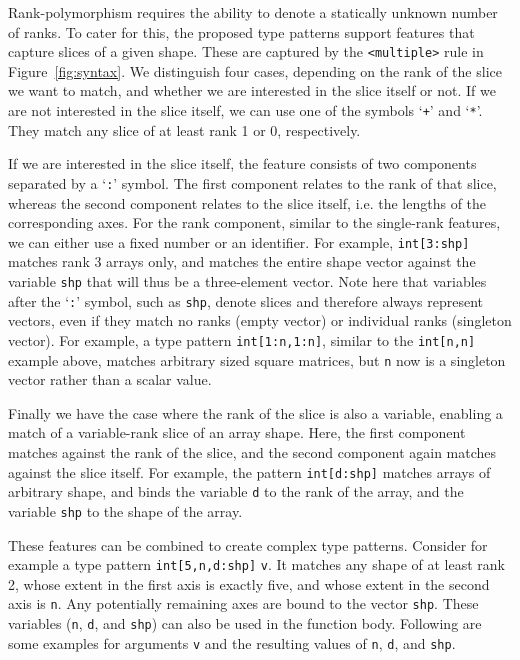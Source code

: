 Rank-polymorphism requires the ability to denote a statically unknown number of ranks.
To cater for this, the proposed type patterns support features that capture slices of a given shape.
These are captured by the \verb|<multiple>| rule in Figure~\ref{fig:syntax}.
We distinguish four cases, depending on the rank of the slice we want to match, and whether we are interested in the slice itself or not.
If we are not interested in the slice itself, we can use one of the symbols `\texttt{+}' and `\texttt{*}'.
They match any slice of at least rank 1 or 0, respectively.

If we are interested in the slice itself, the feature consists of two components separated by a `\texttt{:}' symbol.
The first component relates to the rank of that slice, whereas the second component relates to the slice itself, i.e. the lengths of the corresponding axes.
For the rank component, similar to the single-rank features, we can either use a fixed number or an identifier.
For example, \texttt{int[3:shp]} matches rank 3 arrays only, and matches the entire shape vector against the variable \texttt{shp} that will thus be a three-element vector.
Note here that variables after the `\texttt{:}' symbol, such as \texttt{shp}, denote slices and therefore always represent vectors, even if they match no ranks (empty vector) or individual ranks (singleton vector).
For example, a type pattern \texttt{int[1:n,1:n]}, similar to the \texttt{int[n,n]} example above, matches arbitrary sized square matrices, but \texttt{n} now is a singleton vector rather than a scalar value.

Finally we have the case where the rank of the slice is also a variable, enabling a match of a variable-rank slice of an array shape.
Here, the first component matches against the rank of the slice, and the second component again matches against the slice itself.
For example, the pattern \texttt{int[d:shp]} matches arrays of arbitrary shape, and binds the variable \texttt{d} to the rank of the array, and the variable \texttt{shp} to the shape of the array.

These features can be combined to create complex type patterns.
Consider for example a type pattern \texttt{int[5,n,d:shp]} \texttt{v}.
It matches any shape of at least rank 2, whose extent in the first axis is exactly five, and whose extent in the second axis is \texttt{n}.
Any potentially remaining axes are bound to the vector \texttt{shp}.
These variables (\texttt{n}, \texttt{d}, and \texttt{shp}) can also be used in the function body.
Following are some examples for arguments \texttt{v} and the resulting values of \texttt{n}, \texttt{d}, and \texttt{shp}.

